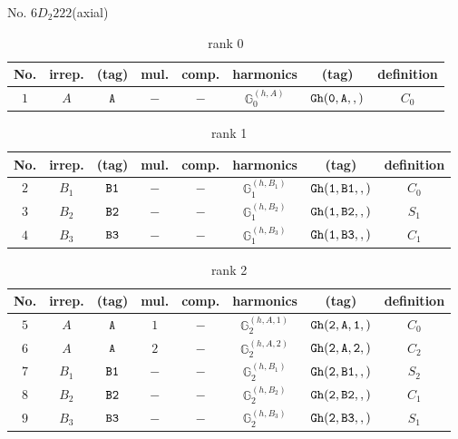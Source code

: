 \documentclass[fleqn,8pt]{jsarticle}
\begin{document}
\setcounter{MaxMatrixCols}{16}

\begin{center}
\LARGE
No. 6\quad$D_{2}$\quad$222$\quad[ orthorhombic ] (axial)
\end{center}
\begin{table}[ht!]
\begin{center}
\caption{rank 0}
\renewcommand{\arraystretch}{1.3}
\begin{tabular}{cccccccc} \hline \hline
No. & irrep. & (tag) & mul. & comp. & harmonics & (tag) & definition \\ \hline
$ 1 $ & $ A $ & $ {\tt A} $ & $ - $ & $ - $ & $ \mathbb{G}_{0}^{(h,A)} $ & $ {\tt Gh(0,A,,)} $ & $ C_{0} $ \\
 \hline \hline
\end{tabular}
\end{center}
\end{table}
\begin{table}[ht!]
\begin{center}
\caption{rank 1}
\renewcommand{\arraystretch}{1.3}
\begin{tabular}{cccccccc} \hline \hline
No. & irrep. & (tag) & mul. & comp. & harmonics & (tag) & definition \\ \hline
$ 2 $ & $ B_{1} $ & $ {\tt B1} $ & $ - $ & $ - $ & $ \mathbb{G}_{1}^{(h,B_{1})} $ & $ {\tt Gh(1,B1,,)} $ & $ C_{0} $ \\
$ 3 $ & $ B_{2} $ & $ {\tt B2} $ & $ - $ & $ - $ & $ \mathbb{G}_{1}^{(h,B_{2})} $ & $ {\tt Gh(1,B2,,)} $ & $ S_{1} $ \\
$ 4 $ & $ B_{3} $ & $ {\tt B3} $ & $ - $ & $ - $ & $ \mathbb{G}_{1}^{(h,B_{3})} $ & $ {\tt Gh(1,B3,,)} $ & $ C_{1} $ \\
 \hline \hline
\end{tabular}
\end{center}
\end{table}
\begin{table}[ht!]
\begin{center}
\caption{rank 2}
\renewcommand{\arraystretch}{1.3}
\begin{tabular}{cccccccc} \hline \hline
No. & irrep. & (tag) & mul. & comp. & harmonics & (tag) & definition \\ \hline
$ 5 $ & $ A $ & $ {\tt A} $ & $ 1 $ & $ - $ & $ \mathbb{G}_{2}^{(h,A,1)} $ & $ {\tt Gh(2,A,1,)} $ & $ C_{0} $ \\
$ 6 $ & $ A $ & $ {\tt A} $ & $ 2 $ & $ - $ & $ \mathbb{G}_{2}^{(h,A,2)} $ & $ {\tt Gh(2,A,2,)} $ & $ C_{2} $ \\
$ 7 $ & $ B_{1} $ & $ {\tt B1} $ & $ - $ & $ - $ & $ \mathbb{G}_{2}^{(h,B_{1})} $ & $ {\tt Gh(2,B1,,)} $ & $ S_{2} $ \\
$ 8 $ & $ B_{2} $ & $ {\tt B2} $ & $ - $ & $ - $ & $ \mathbb{G}_{2}^{(h,B_{2})} $ & $ {\tt Gh(2,B2,,)} $ & $ C_{1} $ \\
$ 9 $ & $ B_{3} $ & $ {\tt B3} $ & $ - $ & $ - $ & $ \mathbb{G}_{2}^{(h,B_{3})} $ & $ {\tt Gh(2,B3,,)} $ & $ S_{1} $ \\
 \hline \hline
\end{tabular}
\end{center}
\end{table}
\end{document}
